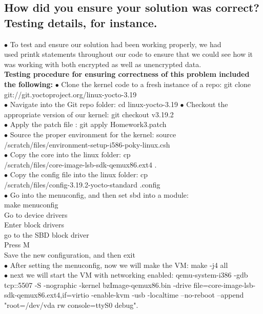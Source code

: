 \documentclass[letterpaper,10pt,fleqn,draftclsnofoot,onecolumn]{IEEEtran}
\begin{document}
	\subsection{How did you ensure your solution was correct? Testing details, for instance.}
	$\bullet$ To test and ensure our solution had been working properly, we had\\ used printk statements throughout our code to ensure that we could see how it was working with both encrypted as well as unencrypted data.\\
	\textbf{Testing procedure for ensuring correctness of this problem included the following:}\newline
	$\bullet$ Clone the kernel code to a fresh instance of a repo: git clone git://git.yoctoproject.org/linux-yocto-3.19\\
	$\bullet$ Navigate into the Git repo folder: cd linux-yocto-3.19
	$\bullet$ Checkout the appropriate version of our kernel: git checkout v3.19.2\\
	$\bullet$ Apply the patch file : git apply Homework3.patch\\
	$\bullet$ Source the proper environment for the kernel: source\\ /scratch/files/environment-setup-i586-poky-linux.csh\\
	$\bullet$ Copy the core into the linux folder: cp\\ /scratch/files/core-image-lsb-sdk-qemux86.ext4 .\\
	$\bullet$ Copy the config file into the linux folder: cp\\ /scratch/files/config-3.19.2-yocto-standard .config\\
	$\bullet$ Go into the menuconfig, and then set sbd into a module:\\
	make menuconfig\\
	Go to device drivers\\
	Enter block drivers\\
	go to the SBD block driver\\
	Press M\\
	Save the new configuration, and then exit\\
	$\bullet$ After setting the menuconfig, now we will make the VM: make -j4 all\\
	$\bullet$ next we will start the VM with networking enabled: qemu-system-i386 -gdb tcp::5507 -S -nographic -kernel bzImage-qemux86.bin -drive file=core-image-lsb-sdk-qemux86.ext4,if=virtio -enable-kvm -usb -localtime --no-reboot --append "root=/dev/vda rw console=ttyS0 debug".\\
\end{document}
